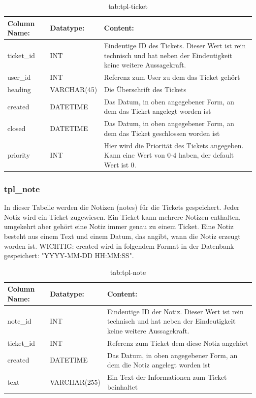 \begin{table}[h]
	\begin{tabular}{|p{3.5cm}|p{4cm}|p{6.2cm}|}
		\hline
		\textbf{Column Name:} & \textbf{Datatype:} & \textbf{Content:}\\
		\hline
		ticket\_id & INT & Eindeutige ID des Tickets. Dieser Wert ist rein technisch und hat neben der Eindeutigkeit keine weitere Aussagekraft.\\
		\hline
		user\_id & INT & Referenz zum User zu dem das Ticket gehört\\
		\hline
		heading & VARCHAR(45) &  Die Überschrift des Tickets\\
		\hline
		created & DATETIME & Das Datum, in oben angegebener Form, an dem das Ticket angelegt worden ist\\
		\hline
		closed & DATETIME & Das Datum, in oben angegebener Form, an dem das Ticket geschlossen worden ist\\
		\hline
		priority & INT & Hier wird die Priorität des Tickets angegeben. Kann eine Wert von 0-4 haben, der default Wert ist 0.\\
		\hline
	\end{tabular}
	\caption{tab:tpl-ticket}
\end{table}
\label{tab:tpl_ticket}

\newpage

\subsubsection{tpl\_note}

In dieser Tabelle werden die Notizen (notes) für die Tickets gespeichert. Jeder Notiz wird ein Ticket zugewiesen. Ein Ticket kann mehrere Notizen enthalten, umgekehrt aber gehört eine Notiz immer genau zu einem Ticket. Eine Notiz besteht aus einem Text und einem Datum, das angibt, wann die Notiz erzeugt worden ist.
WICHTIG: created wird in folgendem Format in der Datenbank gespeichert: "YYYY-MM-DD HH:MM:SS".

\begin{table}[h]
	\begin{tabular}{|p{3.5cm}|p{4cm}|p{6.2cm}|}
		\hline
		\textbf{Column Name:} & \textbf{Datatype:} & \textbf{Content:}\\
		\hline
		note\_id & INT & Eindeutige ID der Notiz. Dieser Wert ist rein technisch und hat neben der Eindeutigkeit keine weitere Aussagekraft.\\
		\hline
		ticket\_id & INT & Referenz zum Ticket dem diese Notiz angehört\\
		\hline
		created & DATETIME & Das Datum, in oben angegebener Form, an dem die Notiz angelegt worden ist\\
		\hline
		text & VARCHAR(255) & Ein Text der Informationen zum Ticket beinhaltet\\
		\hline
	\end{tabular}
	\caption{tab:tpl-note}
\end{table}
\label{tab:tpl_note}

